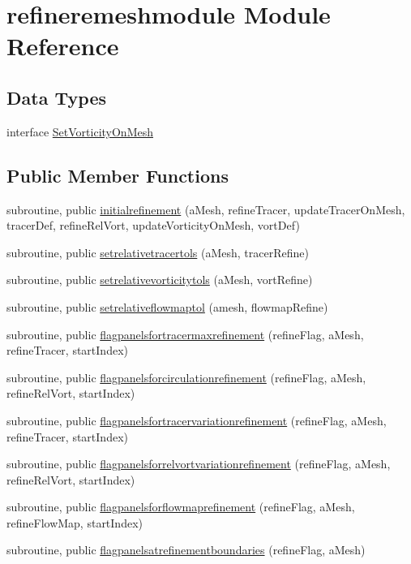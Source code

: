 \hypertarget{classrefineremeshmodule}{\section{refineremeshmodule Module Reference}
\label{classrefineremeshmodule}
}
\subsection*{Data Types}
\begin{DoxyCompactItemize}
\item 
interface \hyperlink{interfacerefineremeshmodule_1_1SetVorticityOnMesh}{Set\+Vorticity\+On\+Mesh}
\end{DoxyCompactItemize}
\subsection*{Public Member Functions}
\begin{DoxyCompactItemize}
\item 
subroutine, public \hyperlink{classrefineremeshmodule_a0439693b33ad6046443c9198279bb904}{initialrefinement} (a\+Mesh, refine\+Tracer, update\+Tracer\+On\+Mesh, tracer\+Def, refine\+Rel\+Vort, update\+Vorticity\+On\+Mesh, vort\+Def)
\item 
subroutine, public \hyperlink{classrefineremeshmodule_a3417b703ac6d0868a4143fe89898b067}{setrelativetracertols} (a\+Mesh, tracer\+Refine)
\item 
subroutine, public \hyperlink{classrefineremeshmodule_a53c76a51e670db9f74f1502a9d9b061b}{setrelativevorticitytols} (a\+Mesh, vort\+Refine)
\item 
subroutine, public \hyperlink{classrefineremeshmodule_a0d4858ab5c718b3bd5c99f78b94a72b2}{setrelativeflowmaptol} (amesh, flowmap\+Refine)
\item 
subroutine, public \hyperlink{classrefineremeshmodule_a3f41b59ebe9e4ed8c6831542eb1b4d67}{flagpanelsfortracermaxrefinement} (refine\+Flag, a\+Mesh, refine\+Tracer, start\+Index)
\item 
subroutine, public \hyperlink{classrefineremeshmodule_a2812069d7718c4103b4bbe79edb0e1e4}{flagpanelsforcirculationrefinement} (refine\+Flag, a\+Mesh, refine\+Rel\+Vort, start\+Index)
\item 
subroutine, public \hyperlink{classrefineremeshmodule_aea671a428b4bf8c3ab5beed7ba946b20}{flagpanelsfortracervariationrefinement} (refine\+Flag, a\+Mesh, refine\+Tracer, start\+Index)
\item 
subroutine, public \hyperlink{classrefineremeshmodule_af4cb0e47e1753afa61e52d20205eb151}{flagpanelsforrelvortvariationrefinement} (refine\+Flag, a\+Mesh, refine\+Rel\+Vort, start\+Index)
\item 
subroutine, public \hyperlink{classrefineremeshmodule_a86738296483519097ed066bb0bc70fab}{flagpanelsforflowmaprefinement} (refine\+Flag, a\+Mesh, refine\+Flow\+Map, start\+Index)
\item 
subroutine, public \hyperlink{classrefineremeshmodule_acaaf5cb5f9f4d240183a2de84faa48af}{flagpanelsatrefinementboundaries} (refine\+Flag, a\+Mesh)
\end{DoxyCompactItemize}
